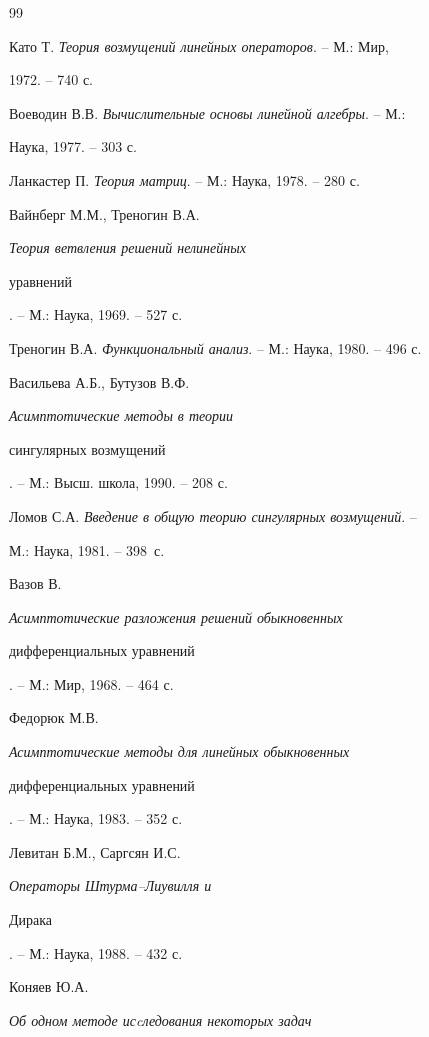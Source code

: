 \begin{thebibliography}{99} 


 




Като Т. {\em Теория возмущений линейных операторов}. -- М.: Мир, 


1972. -- 740 с. 




Воеводин В.В. {\em Вычислительные основы линейной алгебры}. -- М.: 


Наука, 1977. -- 303 с. 




Ланкастер П. {\em Теория матриц}. -- М.: Наука, 1978. -- 280 с. 




Вайнберг М.М., Треногин В.А. {\em Теория ветвления решений нелинейных 


уравнений}. -- М.: Наука, 1969. -- 527 с. 




Треногин В.А. {\em Функциональный анализ}. -- М.: Наука, 1980. -- 496 с. 




Васильева А.Б., Бутузов В.Ф. {\em Асимптотические методы в теории 


сингулярных возмущений}. -- М.: Высш. школа, 1990. -- 208 с. 




Ломов С.А. {\em Введение в общую теорию сингулярных возмущений}. -- 


М.: Наука, 1981. -- 398~с. 




Вазов В. {\em Асимптотические разложения решений обыкновенных 


дифференциальных уравнений}. -- М.: Мир, 1968. -- 464 с. 




Федорюк М.В. {\em Асимптотические методы для линейных обыкновенных 


дифференциальных уравнений}. -- М.: Наука, 1983. -- 352 с. 




Левитан Б.М., Саргсян И.С. {\em Операторы Штурма--Лиувилля и 


Дирака}. -- М.: Наука, 1988. -- 432 с. 




Коняев Ю.А. {\em Об одном методе исcледования некоторых задач 


}
\end{thebibliography}
